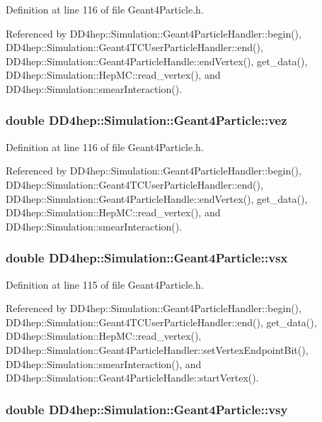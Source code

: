 Definition at line 116 of file Geant4Particle.h.

Referenced by DD4hep::Simulation::Geant4ParticleHandler::begin(), DD4hep::Simulation::Geant4TCUserParticleHandler::end(), DD4hep::Simulation::Geant4ParticleHandle::endVertex(), get\_\-data(), DD4hep::Simulation::HepMC::read\_\-vertex(), and DD4hep::Simulation::smearInteraction().\hypertarget{class_d_d4hep_1_1_simulation_1_1_geant4_particle_a63ac22451aea71547d69c407ae4824da}{
\subsubsection[{vez}]{\setlength{\rightskip}{0pt plus 5cm}double {\bf DD4hep::Simulation::Geant4Particle::vez}}}
\label{class_d_d4hep_1_1_simulation_1_1_geant4_particle_a63ac22451aea71547d69c407ae4824da}


Definition at line 116 of file Geant4Particle.h.

Referenced by DD4hep::Simulation::Geant4ParticleHandler::begin(), DD4hep::Simulation::Geant4TCUserParticleHandler::end(), DD4hep::Simulation::Geant4ParticleHandle::endVertex(), get\_\-data(), DD4hep::Simulation::HepMC::read\_\-vertex(), and DD4hep::Simulation::smearInteraction().\hypertarget{class_d_d4hep_1_1_simulation_1_1_geant4_particle_a3687f6d18f29f056fda968cfccd8251a}{
\subsubsection[{vsx}]{\setlength{\rightskip}{0pt plus 5cm}double {\bf DD4hep::Simulation::Geant4Particle::vsx}}}
\label{class_d_d4hep_1_1_simulation_1_1_geant4_particle_a3687f6d18f29f056fda968cfccd8251a}


Definition at line 115 of file Geant4Particle.h.

Referenced by DD4hep::Simulation::Geant4ParticleHandler::begin(), DD4hep::Simulation::Geant4TCUserParticleHandler::end(), get\_\-data(), DD4hep::Simulation::HepMC::read\_\-vertex(), DD4hep::Simulation::Geant4ParticleHandler::setVertexEndpointBit(), DD4hep::Simulation::smearInteraction(), and DD4hep::Simulation::Geant4ParticleHandle::startVertex().\hypertarget{class_d_d4hep_1_1_simulation_1_1_geant4_particle_a59b9d6e764aa6ea6c2cf011aba056c29}{
\subsubsection[{vsy}]{\setlength{\rightskip}{0pt plus 5cm}double {\bf DD4hep::Simulation::Geant4Particle::vsy}}}
\label{class_d_d4hep_1_1_simulation_1_1_geant4_particle_a59b9d6e764aa6ea6c2cf011aba056c29}


